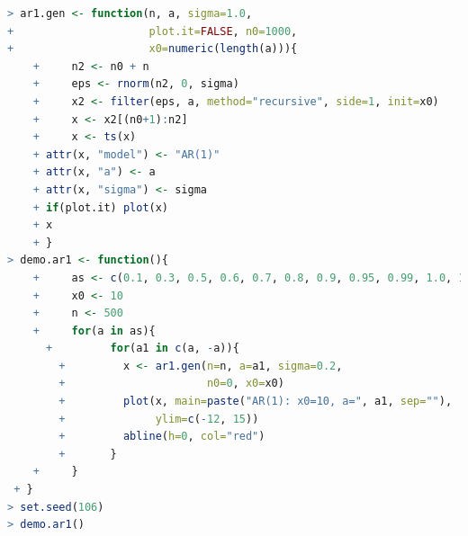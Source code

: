 \documentclass[11pt,a4paper,oneside]{book}
\begin{document}
\begin{lstlisting}[language=r]
> ar1.gen <- function(n, a, sigma=1.0,
+                     plot.it=FALSE, n0=1000,
+                     x0=numeric(length(a))){
	+     n2 <- n0 + n
	+     eps <- rnorm(n2, 0, sigma)
	+     x2 <- filter(eps, a, method="recursive", side=1, init=x0)
	+     x <- x2[(n0+1):n2]
	+     x <- ts(x)
	+ attr(x, "model") <- "AR(1)"
	+ attr(x, "a") <- a
	+ attr(x, "sigma") <- sigma
	+ if(plot.it) plot(x)
	+ x
	+ }
> demo.ar1 <- function(){
	+     as <- c(0.1, 0.3, 0.5, 0.6, 0.7, 0.8, 0.9, 0.95, 0.99, 1.0, 1.001)
	+     x0 <- 10
	+     n <- 500
	+     for(a in as){
	  +         for(a1 in c(a, -a)){
		+         x <- ar1.gen(n=n, a=a1, sigma=0.2,
		+                      n0=0, x0=x0)
		+         plot(x, main=paste("AR(1): x0=10, a=", a1, sep=""),		
		+              ylim=c(-12, 15))
		+         abline(h=0, col="red")
		+       }
	+     }
 + }
> set.seed(106)
> demo.ar1()
\end{lstlisting}
\end{document}
